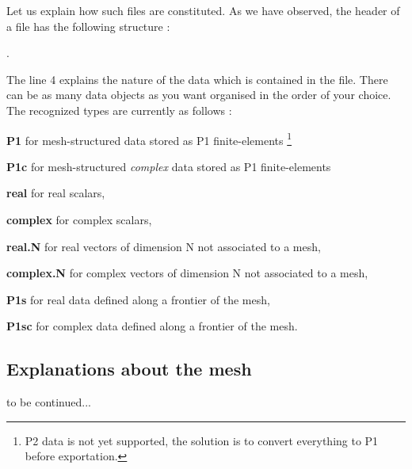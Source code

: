 Let us explain how such files are constituted. As we have observed, the header of a  file has the following structure :

.

The line 4 explains the nature of the data which is contained in the file.
There can be as many data objects as you want organised in the order of your choice. The recognized types are currently as follows :
\begin{description}
\item{ \bf P1}  for mesh-structured data stored as P1 finite-elements
\footnote{P2 data is not yet supported, the solution is to convert everything to P1 before exportation.}  
\item{\bf P1c}  for mesh-structured {\em complex} data stored as P1 finite-elements
\item{\bf real} for real scalars,
\item{\bf complex} for complex scalars,
\item{\bf real.N} for real vectors of dimension N not associated to a mesh,
\item{\bf complex.N} for complex vectors of dimension N not associated to a mesh,
\item{\bf P1s} for real data defined along a frontier of the mesh,
\item{\bf P1sc} for complex data defined along a frontier of the mesh.
\end{description}

\subsection{Explanations about the mesh }

to be continued...







